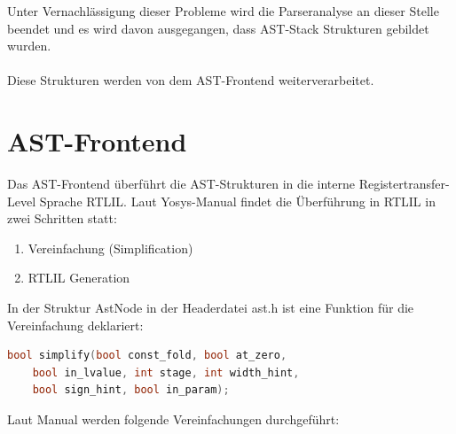 \documentclass[11pt]{report}
\begin{document}
Unter Vernachlässigung dieser Probleme wird die Parseranalyse an dieser Stelle beendet und es wird davon ausgegangen, dass AST-Stack Strukturen gebildet wurden.
\\
\\
Diese Strukturen werden von dem AST-Frontend weiterverarbeitet.
\chapter{AST-Frontend}
Das AST-Frontend überführt die AST-Strukturen in die interne Registertransfer-Level Sprache RTLIL.
Laut Yosys-Manual findet die Überführung in RTLIL in zwei Schritten statt:
\begin{enumerate}
  \item Vereinfachung (Simplification)
  \item RTLIL Generation
\end{enumerate}

In der Struktur AstNode in der Headerdatei ast.h ist eine Funktion für die Vereinfachung deklariert:
\begin{lstlisting}[language=C++]
	bool simplify(bool const_fold, bool at_zero, 
	bool in_lvalue, int stage, int width_hint, 
	bool sign_hint, bool in_param);
\end{lstlisting}

Laut Manual werden folgende Vereinfachungen durchgeführt:
\end{document}
